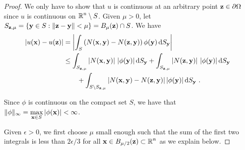 \begin{proof}
We only have to show that $u$ is continuous at an arbitrary point
$\mathbf{z} \in \partial \Omega$ since $u$ is continuous on
$\displaystyle \mathbb{R}^n \setminus S$.  Given $\mu >0$, let
$\displaystyle S_{\mathbf{z},\mu} = \{ \mathbf{y} \in S : \|\mathbf{z}-\mathbf{y}\|<\mu\}
= B_\mu(\mathbf{z}) \cap S$.  We have
\begin{equation} \label{potSlpContEq1}
\begin{split}
|u(\mathbf{x}) - u(\mathbf{z})| &= \left| \int_S
\left( N(\mathbf{x},\mathbf{y}) -  N(\mathbf{z},\mathbf{y}) \right)
\phi(\mathbf{y}) \,\mathrm{d}{S}_{\mathbf{y}} \right| \\
&\leq \int_{S_{\mathbf{z},\mu}} \left| N(\mathbf{x},\mathbf{y}) \right|\,
|\phi(\mathbf{y})| \,\mathrm{d}{S}_{\mathbf{y}}
+ \int_{S_{\mathbf{z},\mu}}\left| N(\mathbf{z},\mathbf{y}) \right|\,
|\phi(\mathbf{y})| \,\mathrm{d}{S}_{\mathbf{y}} \\
&\qquad + \int_{S \setminus S_{\mathbf{z},\mu}}
\left| N(\mathbf{x},\mathbf{y}) - N(\mathbf{z},\mathbf{y}) \right|
|\phi(\mathbf{y}) |\,\mathrm{d}{S}_{\mathbf{y}} \ .
\end{split}
\end{equation}

Since $\phi$ is continuous on the compact set
$S$, we have that $\displaystyle \|\phi\|_\infty =
\max_{\mathbf{x}\in S} |\phi(\mathbf{x})| < \infty$.

Given $\epsilon>0$, we first choose $\mu$ small enough such that
the sum of the first two integrals is less than $2\epsilon/3$ for all
$\displaystyle \mathbf{x} \in B_{\mu/2}(\mathbf{z}) \subset \mathbb{R}^n$ as we
explain below.


\end{proof}

